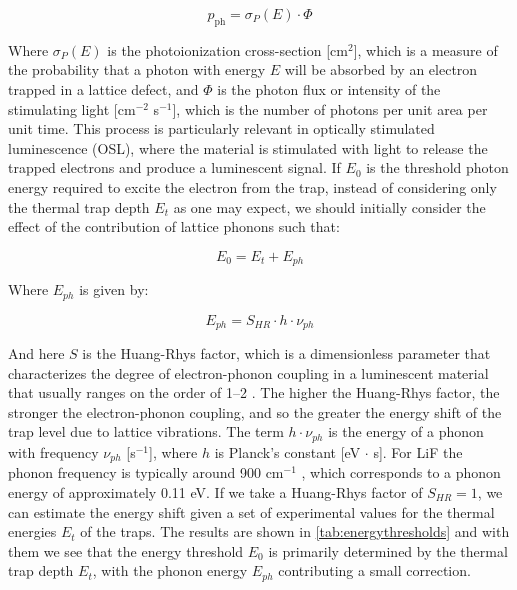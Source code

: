 \begin{equation}
  p_{\text{ph}} = \sigma_P(E) \cdot \Phi
\end{equation}

Where $\sigma_P(E)$ is the photoionization cross-section [cm$^2$], which is a measure of the probability that a photon with energy $E$ will be absorbed by an electron trapped in a lattice defect, and $\Phi$ is the photon flux or intensity of the stimulating light [cm$^{-2}$ s$^{-1}$], which is the number of photons per unit area per unit time. This process is particularly relevant in optically stimulated luminescence (OSL), where the material is stimulated with light to release the trapped electrons and produce a luminescent signal. If $E_0$ is the threshold photon energy required to excite the electron from the trap, instead of considering only the thermal trap depth $E_t$ as one may expect, we should initially consider the effect of the contribution of lattice phonons such that:

\begin{equation}
  E_0 = E_t + E_{ph}
\end{equation}

Where $E_{ph}$ is given by:

\begin{equation}
  E_{ph} = S_{H\!R} \cdot h \cdot \nu_{ph}
\end{equation}

\vspace{7pt}

And here $S$ is the Huang-Rhys factor, which is a dimensionless parameter that characterizes the degree of electron-phonon coupling in a luminescent material that usually ranges on the order of 1--2 \cite{mckeever_1995}. The higher the Huang-Rhys factor, the stronger the electron-phonon coupling, and so the greater the energy shift of the trap level due to lattice vibrations. The term $h \cdot \nu_{ph}$ is the energy of a phonon with frequency $\nu_{ph}$ [s$^{-1}$], where $h$ is Planck's constant [eV $\cdot$ s]. For LiF the phonon frequency is typically around 900 cm$^{-1}$ \cite{bransden_atomics}, which corresponds to a phonon energy of approximately 0.11 eV. If we take a Huang-Rhys factor of $S_{HR} = 1$, we can estimate the energy shift given a set of experimental values for the thermal energies $E_t$ of the traps. The results are shown in \ref{tab:energythresholds} and with them we see that the energy threshold $E_0$ is primarily determined by the thermal trap depth $E_t$, with the phonon energy $E_{ph}$ contributing a small correction.

